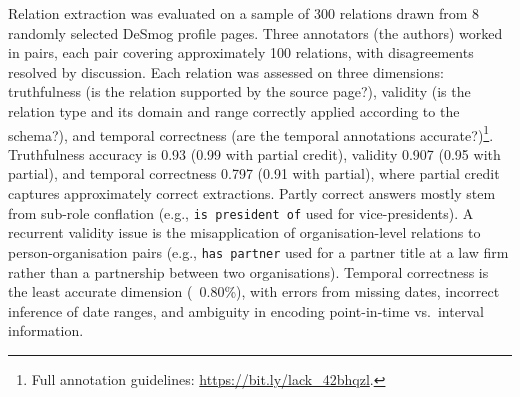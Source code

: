 Relation extraction was evaluated on a sample of 300 relations drawn from 8 randomly selected DeSmog profile pages.
Three annotators (the authors) worked in pairs, each pair covering approximately 100 relations, with disagreements resolved by discussion.
Each relation was assessed on three dimensions: truthfulness (is the relation supported by the source page?), validity (is the relation type and its domain and range correctly applied according to the schema?), and temporal correctness (are the temporal annotations accurate?)\footnote{Full annotation guidelines: \url{https://bit.ly/lack_42bhqzl}.}.
Truthfulness accuracy is 0.93 (0.99 with partial credit), validity 0.907 (0.95 with partial), and temporal correctness 0.797 (0.91 with partial), where partial credit captures approximately correct extractions.
%
Partly correct answers mostly stem from sub-role conflation (e.g., \texttt{is president of} used for vice-presidents).
A recurrent validity issue is the misapplication of organisation-level relations to person-organisation pairs (e.g., \texttt{has partner} used for a partner title at a law firm rather than a partnership between two organisations).
Temporal correctness is the least accurate dimension (~0.80\%), with errors from missing dates, incorrect inference of date ranges, and ambiguity in encoding point-in-time vs.\ interval information.

